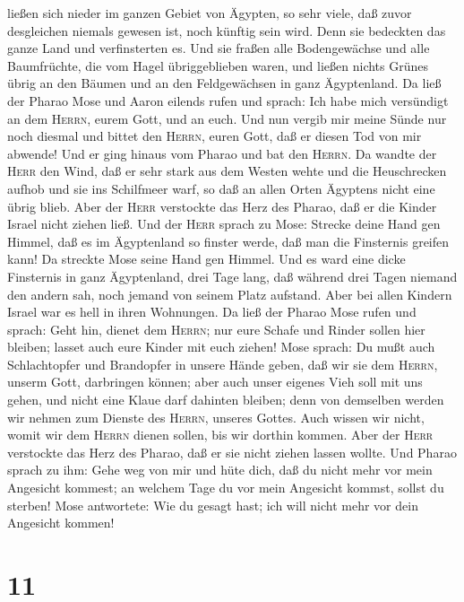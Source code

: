 ließen sich nieder im ganzen Gebiet von Ägypten, so sehr viele, daß
zuvor desgleichen niemals gewesen ist, noch künftig sein wird.
 Denn sie bedeckten das ganze Land und verfinsterten es.
Und sie fraßen alle Bodengewächse und alle Baumfrüchte, die vom Hagel
übriggeblieben waren, und ließen nichts Grünes übrig an den Bäumen und
an den Feldgewächsen in ganz Ägyptenland.  Da ließ der
Pharao Mose und Aaron eilends rufen und sprach: Ich habe mich versündigt
an dem \textsc{Herrn}, eurem Gott, und an euch.  Und nun
vergib mir meine Sünde nur noch diesmal und bittet den \textsc{Herrn},
euren Gott, daß er diesen Tod von mir abwende!  Und er
ging hinaus vom Pharao und bat den \textsc{Herrn}.  Da
wandte der \textsc{Herr} den Wind, daß er sehr stark aus dem Westen
wehte und die Heuschrecken aufhob und sie ins Schilfmeer warf, so daß an
allen Orten Ägyptens nicht eine übrig blieb.  Aber der
\textsc{Herr} verstockte das Herz des Pharao, daß er die Kinder Israel
nicht ziehen ließ.  Und der \textsc{Herr} sprach zu Mose:
Strecke deine Hand gen Himmel, daß es im Ägyptenland so finster werde,
daß man die Finsternis greifen kann!  Da streckte Mose
seine Hand gen Himmel. Und es ward eine dicke Finsternis in ganz
Ägyptenland, drei Tage lang,  daß während drei Tagen
niemand den andern sah, noch jemand von seinem Platz aufstand. Aber bei
allen Kindern Israel war es hell in ihren Wohnungen.  Da
ließ der Pharao Mose rufen und sprach: Geht hin, dienet dem
\textsc{Herrn}; nur eure Schafe und Rinder sollen hier bleiben; lasset
auch eure Kinder mit euch ziehen!  Mose sprach: Du mußt
auch Schlachtopfer und Brandopfer in unsere Hände geben, daß wir sie dem
\textsc{Herrn}, unserm Gott, darbringen können;  aber
auch unser eigenes Vieh soll mit uns gehen, und nicht eine Klaue darf
dahinten bleiben; denn von demselben werden wir nehmen zum Dienste des
\textsc{Herrn}, unseres Gottes. Auch wissen wir nicht, womit wir dem
\textsc{Herrn} dienen sollen, bis wir dorthin kommen. 
Aber der \textsc{Herr} verstockte das Herz des Pharao, daß er sie nicht
ziehen lassen wollte.  Und Pharao sprach zu ihm: Gehe weg
von mir und hüte dich, daß du nicht mehr vor mein Angesicht kommest; an
welchem Tage du vor mein Angesicht kommst, sollst du sterben!
 Mose antwortete: Wie du gesagt hast; ich will nicht mehr
vor dein Angesicht kommen!

\hypertarget{section-10}{%
\section{11}\label{section-10}}

